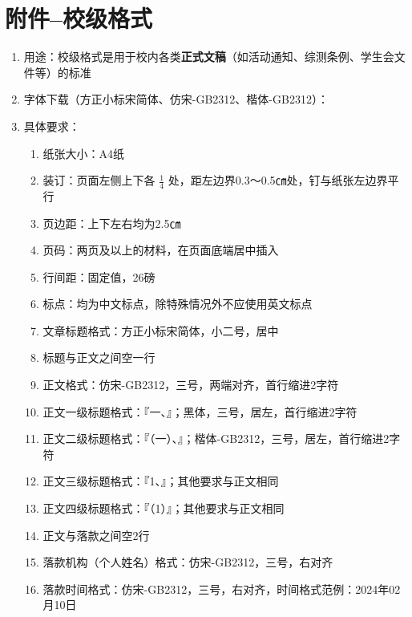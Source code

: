 \part[附件--校级格式]{附件--校级格式}
\begin{enumerate}
    \item 用途：校级格式是用于校内各类\textbf{正式文稿}（如活动通知、综测条例、学生会文件等）的标准
    \item 字体下载（方正小标宋简体、仿宋-GB2312、楷体-GB2312）：
    \item 具体要求：
          \begin{enumerate}
              \item 纸张大小：A4纸
              \item 装订：页面左侧上下各 $\frac{1}{4}$ 处，距左边界0.3～0.5㎝处，钉与纸张左边界平行
              \item 页边距：上下左右均为2.5㎝
              \item 页码：两页及以上的材料，在页面底端居中插入
              \item 行间距：固定值，26磅
              \item 标点：均为中文标点，除特殊情况\footnotemark 外不应使用英文标点
              \item 文章标题格式：方正小标宋简体，小二号，居中
              \item 标题与正文之间空一行
              \item 正文格式：仿宋-GB2312，三号，两端对齐，首行缩进2字符
              \item 正文一级标题格式：『一、』；黑体，三号，居左，首行缩进2字符
              \item 正文二级标题格式：『（一）、』；楷体-GB2312，三号，居左，首行缩进2字符
              \item 正文三级标题格式：『1、』；其他要求与正文相同
              \item 正文四级标题格式：『（1）』；其他要求与正文相同
              \item 正文与落款之间空2行
              \item 落款机构（个人姓名）格式：仿宋-GB2312，三号，右对齐
              \item 落款时间格式：仿宋-GB2312，三号，右对齐，时间格式范例：2024年02月10日
          \end{enumerate}
\end{enumerate}

